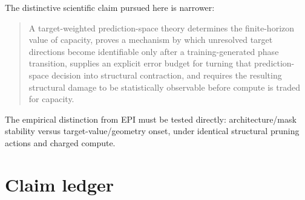 The distinctive scientific claim pursued here is narrower:
\begin{quote}
A target-weighted prediction-space theory determines the finite-horizon value of capacity, proves a mechanism by which unresolved target directions become identifiable only after a training-generated phase transition, supplies an explicit error budget for turning that prediction-space decision into structural contraction, and requires the resulting structural damage to be statistically observable before compute is traded for capacity.
\end{quote}
The empirical distinction from EPI must be tested directly: architecture/mask stability versus target-value/geometry onset, under identical structural pruning actions and charged compute.

\section{Claim ledger}

